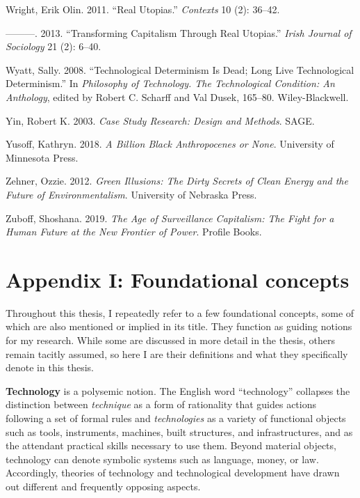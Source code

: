 \documentclass[a4paper, nobind]{templates/ociamthesis}
\newlength{\cslhangindent}
\newenvironment{CSLReferences}[2] %
 {%
  \setlength{\parindent}{0pt}
  \ifodd #1
  \let\oldpar\par
  \def\par{\hangindent=\cslhangindent\oldpar}
  \fi
  \setlength{\parskip}{1mm}
  \setlength{\baselineskip}{6mm}
 }%
 {}
\begin{document}
\begin{CSLReferences}{1}{0}
\leavevmode{}%
Wright, Erik Olin. 2011. {``Real {Utopias}.''} \emph{Contexts} 10 (2): 36--42.

\leavevmode{}%
---------. 2013. {``Transforming Capitalism Through Real Utopias.''} \emph{Irish Journal of Sociology} 21 (2): 6--40.

\leavevmode{}%
Wyatt, Sally. 2008. {``Technological {Determinism} Is {Dead}; {Long Live Technological Determinism}.''} In \emph{Philosophy of {Technology}. {The Technological Condition}: {An Anthology}}, edited by Robert C. Scharff and Val Dusek, 165--80. {Wiley-Blackwell}.

\leavevmode{}%
Yin, Robert K. 2003. \emph{Case {Study Research}: {Design} and {Methods}}. {SAGE}.

\leavevmode{}%
Yusoff, Kathryn. 2018. \emph{A Billion Black {Anthropocenes} or None}. {University of Minnesota Press}.

\leavevmode{}%
Zehner, Ozzie. 2012. \emph{Green {Illusions}: {The Dirty Secrets} of {Clean Energy} and the {Future} of {Environmentalism}}. {University of Nebraska Press}.

\leavevmode{}%
Zuboff, Shoshana. 2019. \emph{The {Age} of {Surveillance Capitalism}: {The Fight} for a {Human Future} at the {New Frontier} of {Power}}. {Profile Books}.

\end{CSLReferences}

\startappendices

\hypertarget{appendix-i-foundational-concepts}{%
\chapter{Appendix I: Foundational concepts}\label{appendix-i-foundational-concepts}}

Throughout this thesis, I repeatedly refer to a few foundational concepts, some of which are also mentioned or implied in its title. They function as guiding notions for my research. While some are discussed in more detail in the thesis, others remain tacitly assumed, so here I are their definitions and what they specifically denote in this thesis.

\textbf{Technology} is a polysemic notion. The English word ``technology'' collapses the distinction between \emph{technique} as a form of rationality that guides actions following a set of formal rules and \emph{technologies} as a variety of functional objects such as tools, instruments, machines, built structures, and infrastructures, and as the attendant practical skills necessary to use them. Beyond material objects, technology can denote symbolic systems such as language, money, or law. Accordingly, theories of technology and technological development have drawn out different and frequently opposing aspects.
\end{document}
